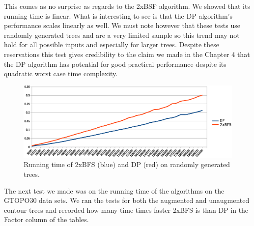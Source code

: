 This comes as no surprise as regards to the 2xBSF algorithm. We showed that its running time is linear. What is interesting to see is that the DP algorithm's performance scales linearly as well. We must note however that these tests use randomly generated trees and are a very limited sample so this trend may not hold for all possible inputs and especially for larger trees. Despite these reservations this test gives credibility to the claim we made in the Chapter 4 that the DP algorithm has potential for good practical performance despite its quadratic worst case time complexity.

\begin{figure}[h]%
    \centering
    \includegraphics[center, scale=0.6 ]{./images/empirical/chart-cp-2bfs.eps}
    \caption{Running time of 2xBFS (blue) and DP (red) on randomly generated trees. }%
    \label{fig:2xbfs-dp}%
\end{figure}



The next test we made was on the running time of the algorithms on the GTOPO30 data sets. We ran the tests for both the augmented and unaugmented contour trees and recorded how many time times faster 2xBFS is than DP in the Factor column of the tables.

